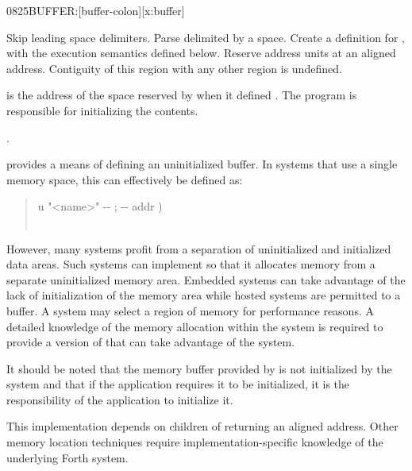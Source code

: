 \begin{worddef}{0825}{BUFFER:}[buffer-colon][x:buffer]
\item {}

	Skip leading space delimiters. Parse  delimited by a space.
	Create a definition for , with the execution semantics defined
	below.  Reserve  address units at an aligned address.
	Contiguity of this region with any other region is undefined.

\execute[name]

	 is the address of the space reserved by  when
	it defined .  The program is responsible for initializing the
	contents.

\see {}.

	\begin{rationale}
		 provides a means of defining an uninitialized buffer.
		In systems that use a single memory space, this can effectively
		be defined as:

		\begin{quote}\ttfamily
			\word{:}   u "<name>" -{}- ; -{}- addr ) \\
			\tab\,  \\
			\word{;}
		\end{quote} 

		However, many systems profit from a separation of uninitialized and
		initialized data areas.  Such systems can implement  so
		that it allocates memory from a separate uninitialized memory area.
		Embedded systems can take advantage of the lack of initialization of the
		memory area while hosted systems are permitted to 
		a buffer.
		A system may select a region of memory for performance reasons.
		A detailed knowledge of the memory allocation within the system
		is required to provide a version of  that can take
		advantage of the system.

		It should be noted that the memory buffer provided by 
		is not initialized by the system and that if the application requires
		it to be initialized, it is the responsibility of the application to
		initialize it.
	\end{rationale}

	\begin{implement}
		\dffamily
		This implementation depends on children of 
		returning an aligned address.  Other memory location techniques
		require implementation-specific knowledge of the underlying Forth
		system.


\end{implement}
\end{worddef}

